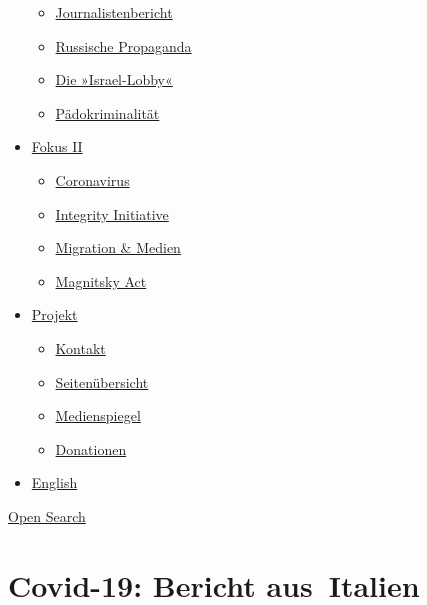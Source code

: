 \begin{itemize}
  \begin{itemize}
  \tightlist
  \item
    \href{https://swprs.org/bericht-eines-journalisten/}{Journalistenbericht}
  \item
    \href{https://swprs.org/russische-propaganda/}{Russische Propaganda}
  \item
    \href{https://swprs.org/die-israel-lobby-fakten-und-mythen/}{Die
    »Israel-Lobby«}
  \item
    \href{https://swprs.org/geopolitik-und-paedokriminalitaet/}{Pädokriminalität}
  \end{itemize}
\item
  \href{https://swprs.org/migration-und-medien/}{Fokus II}

  \begin{itemize}
  \tightlist
  \item
    \href{https://swprs.org/covid-19-hinweis-ii/}{Coronavirus}
  \item
    \href{https://swprs.org/die-integrity-initiative/}{Integrity
    Initiative}
  \item
    \href{https://swprs.org/migration-und-medien/}{Migration \& Medien}
  \item
    \href{https://swprs.org/der-fall-magnitsky/}{Magnitsky Act}
  \end{itemize}
\item
  \href{https://swprs.org/kontakt/}{Projekt}

  \begin{itemize}
  \tightlist
  \item
    \href{https://swprs.org/kontakt/}{Kontakt}
  \item
    \href{https://swprs.org/uebersicht/}{Seitenübersicht}
  \item
    \href{https://swprs.org/medienspiegel/}{Medienspiegel}
  \item
    \href{https://swprs.org/donationen/}{Donationen}
  \end{itemize}
\item
  \href{https://swprs.org/contact/}{English}
\end{itemize}

\protect\hyperlink{}{Open Search}

\hypertarget{covid-19-bericht-aus-italien}{%
\section{Covid-19: Bericht
aus~Italien}\label{covid-19-bericht-aus-italien}}

